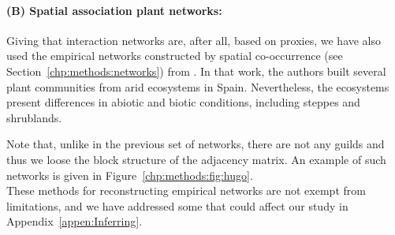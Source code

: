 \paragraph{(B) Spatial association plant networks:} 
Giving that interaction networks are, after all, based on proxies, we have also used the empirical networks constructed by spatial co-occurrence (see Section~\ref{chp:methods:networks})  from \cite{Saiz2017EvidenceNetworks}. In that work, the authors built several plant communities from arid ecosystems in Spain. Nevertheless, the ecosystems present differences in abiotic and biotic conditions, including steppes and shrublands. 

Note that, unlike in the previous set of networks, there are not any guilds and thus we loose the block structure of the adjacency matrix. An example of such networks is given in Figure~\ref{chp:methods:fig:hugo}. \\


 

These methods for reconstructing empirical networks are  not exempt  from  limitations, and we have addressed some that could affect our study in Appendix~\ref{appen:Inferring}. 

